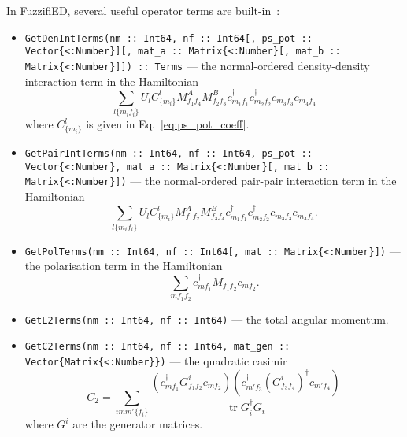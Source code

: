 \documentclass{timesjhep}
\begin{document}
In FuzzifiED, several useful operator terms are built-in~:
\begin{itemize}
    \item \lstinline|GetDenIntTerms(nm :: Int64, nf :: Int64[, ps_pot :: Vector{<:Number}][, mat_a :: Matrix{<:Number}[, mat_b :: Matrix{<:Number}]]) :: Terms| --- the normal-ordered density-density interaction term in the Hamiltonian 
    \begin{equation}
        \sum_{l\{m_if_i\}}U_lC^l_{\{m_i\}}M^A_{f_1f_4}M^B_{f_2f_3}c^\dagger_{m_1f_1}c^\dagger_{m_2f_2}c_{m_3f_3}c_{m_4f_4}
    \end{equation}
    where $C^l_{\{m_i\}}$ is given in Eq.~\eqref{eq:ps_pot_coeff}.
    \item \lstinline|GetPairIntTerms(nm :: Int64, nf :: Int64, ps_pot :: Vector{<:Number}, mat_a :: Matrix{<:Number}[, mat_b :: Matrix{<:Number}])| --- the normal-ordered pair-pair interaction term in the Hamiltonian 
    \begin{equation}
        \sum_{l\{m_if_i\}}U_lC^l_{\{m_i\}}M^A_{f_1f_2}M^B_{f_3f_4}c^\dagger_{m_1f_1}c^\dagger_{m_2f_2}c_{m_3f_3}c_{m_4f_4}.
    \end{equation}
    \item \lstinline|GetPolTerms(nm :: Int64, nf :: Int64[, mat :: Matrix{<:Number}])| --- the polarisation term in the Hamiltonian 
    \begin{equation}
        \sum_{mf_1f_2}c^\dagger_{mf_1}M_{f_1f_2}c_{mf_2}.
    \end{equation}
    \item \lstinline|GetL2Terms(nm :: Int64, nf :: Int64)| --- the total angular momentum. 
    \item \lstinline|GetC2Terms(nm :: Int64, nf :: Int64, mat_gen :: Vector{Matrix{<:Number}})| --- the quadratic casimir 
    \begin{equation}
        C_2=\sum_{imm'\{f_i\}}\frac{(c^\dagger_{mf_1}G^i_{f_1f_2}c_{mf_2})(c^\dagger_{m'f_3}(G^i_{f_3f_4})^\dagger c_{m'f_4})}{\operatorname{tr}G_i^\dagger G_i}
    \end{equation}
    where $G^i$ are the generator matrices.
\end{itemize}
\end{document}
